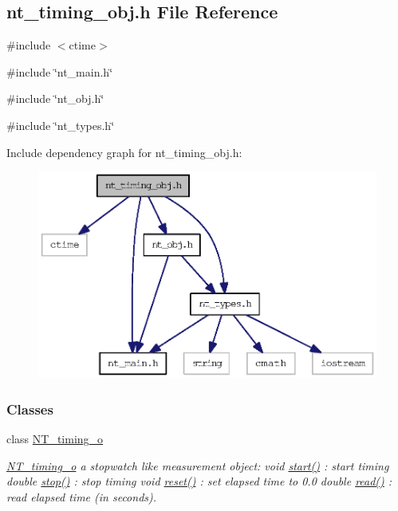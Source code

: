 \subsection{nt\_\-timing\_\-obj.h File Reference}
\label{nt__timing__obj_8h}
{\ttfamily \#include $<$ctime$>$}\par
{\ttfamily \#include \char`\"{}nt\_\-main.h\char`\"{}}\par
{\ttfamily \#include \char`\"{}nt\_\-obj.h\char`\"{}}\par
{\ttfamily \#include \char`\"{}nt\_\-types.h\char`\"{}}\par
Include dependency graph for nt\_\-timing\_\-obj.h:
\nopagebreak
\begin{figure}[H]
\begin{center}
\leavevmode
\includegraphics[width=367pt]{nt__timing__obj_8h__incl}
\end{center}
\end{figure}
\subsubsection*{Classes}
\begin{DoxyCompactItemize}
\item 
class \hyperlink{class_n_t__timing__o}{NT\_\-timing\_\-o}
\begin{DoxyCompactList}\small\item\em \hyperlink{class_n_t__timing__o}{NT\_\-timing\_\-o} a stopwatch like measurement object: void \hyperlink{class_n_t__timing__o_a6f77c3f09d24a4f1351e794d1126142c}{start()} : start timing double \hyperlink{class_n_t__timing__o_aa7b5eb7558cf7afab67dab8aefbbd7ed}{stop()} : stop timing void \hyperlink{class_n_t__timing__o_af7e187132a8caa8c6316ca6f5631e437}{reset()} : set elapsed time to 0.0 double \hyperlink{class_n_t__timing__o_a94c4c21db46fc1972380ec3c9c94f514}{read()} : read elapsed time (in seconds). \item\end{DoxyCompactList}\end{DoxyCompactItemize}
